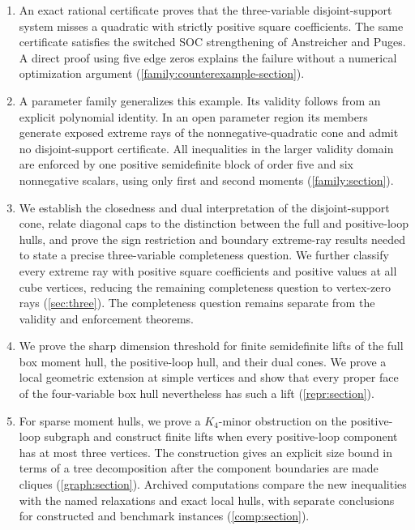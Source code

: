 \begin{enumerate}[leftmargin=*,itemsep=5pt]
\item An exact rational certificate proves that the three-variable
disjoint-support system misses a quadratic with strictly positive square
coefficients.
The same certificate satisfies the switched SOC strengthening of
Anstreicher and Puges. A direct proof using five edge zeros explains the
failure without a numerical optimization argument
(\cref{family:counterexample-section}).

\item A parameter family generalizes this example. Its validity follows
from an explicit polynomial identity. In an open parameter region its
members generate exposed extreme rays of the nonnegative-quadratic cone
and admit no disjoint-support certificate. All inequalities in the larger
validity domain are enforced by one positive semidefinite block of order
five and six nonnegative scalars, using only first and second moments
(\cref{family:section}).

\item We establish the closedness and dual interpretation of the
disjoint-support cone, relate diagonal caps to the distinction between
the full and positive-loop hulls, and prove the sign restriction and
boundary extreme-ray results needed to state a precise three-variable
completeness question. We further classify every extreme ray with positive
square coefficients and positive values at all cube vertices, reducing
the remaining completeness question to vertex-zero rays
(\cref{sec:three}). The completeness question remains separate
from the validity and enforcement theorems.

\item We prove the sharp dimension threshold for finite semidefinite
lifts of the full box moment hull, the positive-loop hull, and their
dual cones. We prove a local geometric extension at simple vertices and
show that every proper face of the four-variable box hull nevertheless
has such a lift (\cref{repr:section}).

\item For sparse moment hulls, we prove a $K_4$-minor obstruction on the
positive-loop subgraph and construct finite lifts when every positive-loop
component has at most three vertices. The construction gives an explicit
size bound in terms of a tree decomposition after the component boundaries
are made cliques (\cref{graph:section}). Archived computations compare the
new inequalities with the named relaxations and exact local hulls, with
separate conclusions for constructed and benchmark instances
(\cref{comp:section}).
\end{enumerate}

